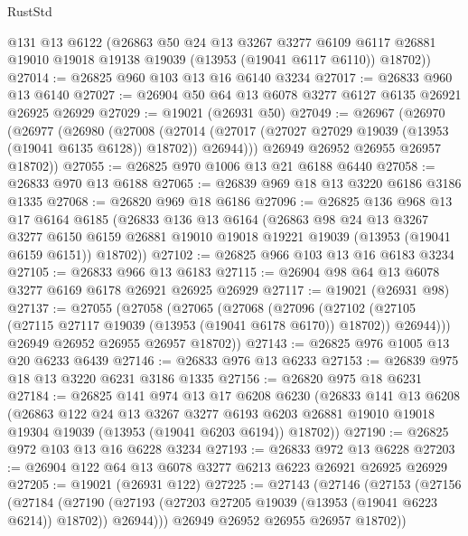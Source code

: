 \begin{lexlean}{RustStd}
\begin{coremodule}
      @131
      @13
      @6122
      (@26863
        @50
        @24
        @13
        @3267
        @3277
        @6109
        @6117
        @26881
        @19010
        @19018
        @19138
        @19039
        (@13953 (@19041 @6117 @6110))
        @18702))
@27014 := @26825 @960 @103 @13 @16 @6140 @3234
@27017 := @26833 @960 @13 @6140
@27027 := @26904 @50 @64 @13 @6078 @3277 @6127 @6135 @26921 @26925 @26929
@27029 := @19021 (@26931 @50)
@27049 := @26967
    (@26970
      (@26977
        (@26980
          (@27008
            (@27014 (@27017 (@27027 @27029 @19039 (@13953 (@19041 @6135 @6128)) @18702)) @26944)))
        @26949
        @26952
        @26955
        @26957
        @18702))
@27055 := @26825 @970 @1006 @13 @21 @6188 @6440
@27058 := @26833 @970 @13 @6188
@27065 := @26839 @969 @18 @13 @3220 @6186 @3186 @1335
@27068 := @26820 @969 @18 @6186
@27096 := @26825
    @136
    @968
    @13
    @17
    @6164
    @6185
    (@26833
      @136
      @13
      @6164
      (@26863
        @98
        @24
        @13
        @3267
        @3277
        @6150
        @6159
        @26881
        @19010
        @19018
        @19221
        @19039
        (@13953 (@19041 @6159 @6151))
        @18702))
@27102 := @26825 @966 @103 @13 @16 @6183 @3234
@27105 := @26833 @966 @13 @6183
@27115 := @26904 @98 @64 @13 @6078 @3277 @6169 @6178 @26921 @26925 @26929
@27117 := @19021 (@26931 @98)
@27137 := @27055
    (@27058
      (@27065
        (@27068
          (@27096
            (@27102 (@27105 (@27115 @27117 @19039 (@13953 (@19041 @6178 @6170)) @18702)) @26944)))
        @26949
        @26952
        @26955
        @26957
        @18702))
@27143 := @26825 @976 @1005 @13 @20 @6233 @6439
@27146 := @26833 @976 @13 @6233
@27153 := @26839 @975 @18 @13 @3220 @6231 @3186 @1335
@27156 := @26820 @975 @18 @6231
@27184 := @26825
    @141
    @974
    @13
    @17
    @6208
    @6230
    (@26833
      @141
      @13
      @6208
      (@26863
        @122
        @24
        @13
        @3267
        @3277
        @6193
        @6203
        @26881
        @19010
        @19018
        @19304
        @19039
        (@13953 (@19041 @6203 @6194))
        @18702))
@27190 := @26825 @972 @103 @13 @16 @6228 @3234
@27193 := @26833 @972 @13 @6228
@27203 := @26904 @122 @64 @13 @6078 @3277 @6213 @6223 @26921 @26925 @26929
@27205 := @19021 (@26931 @122)
@27225 := @27143
    (@27146
      (@27153
        (@27156
          (@27184
            (@27190 (@27193 (@27203 @27205 @19039 (@13953 (@19041 @6223 @6214)) @18702)) @26944)))
        @26949
        @26952
        @26955
        @26957
        @18702))

\end{coremodule}
\end{lexlean}
